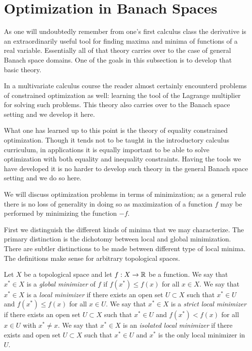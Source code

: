 \chapter{Optimization in Banach Spaces}
As one will undoubtedly remember from one's first calculus class the
derivative is an extraordinarily useful tool for finding maxima and
minima of functions of a real variable.  Essentially all of that
theory carries over to the case of general Banach space domains.  One
of the goals in this subsection is to develop that basic theory.  

In a multivariate calculus course the reader almost certainly
encounterd problems of constrained optimization as well: learning the
tool of the Lagrange multiplier for solving such problems. This theory
also carries over to the Banach space setting and we develop it here.

What one has learned up to this point is the theory of equality
constrained optimization.  Though it tends not to be taught in the
introductory
calculus curriculum, in applications it is equally important to be able to
solve optimization with both equality and inequality constraints.
Having the tools we have developed it is no harder to develop such
theory in the general Banach space setting and we do so here.

We will discuss optimization problems in terms of minimization; as a
general rule there is no loss of generality in doing so as
maximization of a function $f$ may be performed by minimizing the
function $-f$.  

First we distinguish the different kinds of minima that we may
characterize.  The primary distinction is the dichotomy between local
and global minimization.  There are subtler distinctions to be made
between different type of local minima.  The definitions make sense
for arbitrary topological spaces.

\begin{defn}Let $X$ be a topological space and let $f : X \to \mathbb{R}$
  be a function.  We say that $x^* \in X$ is a \emph{global minimizer}
  of $f$ if $f(x^*) \leq f(x)$ for all $x \in X$.  We say that $x^*
  \in X$ is a \emph{local minimizer} if there exists an open set $U
  \subset X$ such that $x^* \in U$ and $f(x^*) \leq f(x)$ for all $x
  \in U$.  We say that $x^*
  \in X$ is a \emph{strict local minimizer} if there exists an open set $U
  \subset X$ such that $x^* \in U$ and $f(x^*) < f(x)$ for all $x
  \in U$ with $x^* \neq x$.  We say that $x^* \in X$ is an
  \emph{isolated local minimizer} if there exists and open set $U
  \subset X$ such that $x^* \in U$ and $x^*$ is the only local
  minimizer in $U$.
\end{defn}

